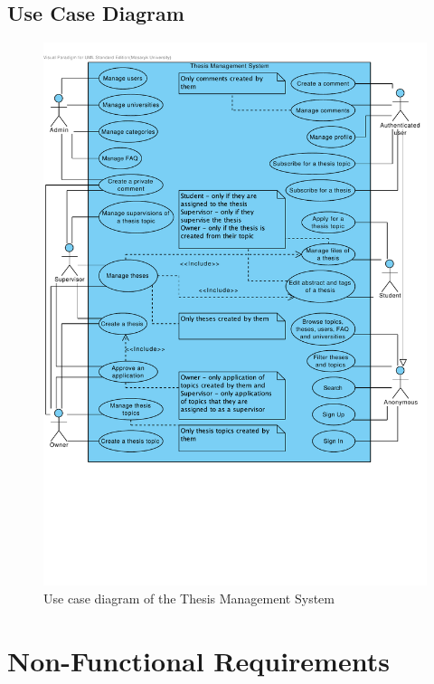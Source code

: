 \newpage

\subsection{Use Case Diagram}

\begin{figure}[H]
    \centering
        \includegraphics[trim=0 190 10 30, clip, keepaspectratio, width=\textwidth]{./images/use-case.pdf}
    \caption{Use case diagram of the Thesis Management System}
    \label{fig:use-case}
\end{figure}

\section{Non-Functional Requirements}

